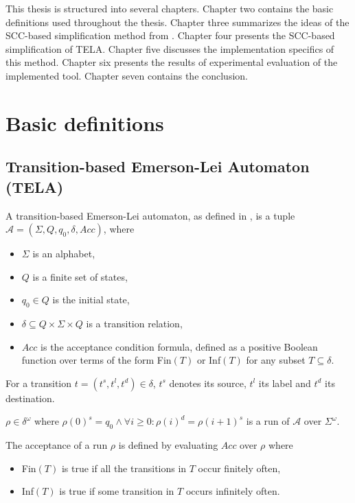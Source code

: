 \documentclass[
  digital, %
  twoside, %
  table,   %
  lof,     %
  lot,     %
]{fithesis3}
\begin{document}
This thesis is structured into several chapters. Chapter two contains the basic definitions used throughout the thesis. Chapter three summarizes the ideas of the SCC-based simplification method from \cite{spin2013}.  Chapter four presents the SCC-based simplification of TELA. Chapter five discusses the implementation specifics of this method. Chapter six presents the results of experimental evaluation of the implemented tool. Chapter seven contains the conclusion.

\chapter{Basic definitions}

\section{Transition-based Emerson-Lei Automaton (TELA)} 
A transition-based Emerson-Lei automaton, as defined in \cite{bloemen2017}, is a tuple $\mathcal{A} = (\Sigma, Q, q_0, \delta, Acc)$, where
\begin{itemize}
  \item $\Sigma$ is an alphabet,
  \item $Q$ is a finite set of states,
  \item $q_0 \in Q$ is the initial state,
  \item $\delta \subseteq Q \times \Sigma \times Q$ is a transition relation,
  \item $Acc$ is the acceptance condition formula, defined as a positive Boolean function over terms of the form Fin$(T)$ or Inf$(T)$ for any subset $T \subseteq \delta$. %
\end{itemize}

For a transition $t = (t^s, t^l, t^d) \in \delta$, $t^s$ denotes its source, $t^l$ its label and $t^d$ its destination.

$\rho \in \delta^\omega$ where $\rho(0)^s = q_0 \wedge \forall i \geq 0 : \rho(i)^d = \rho(i + 1)^s$ is a run of $\mathcal{A}$ over $\Sigma^\omega$.

The acceptance of a run $\rho$ is defined by evaluating $Acc$ over $\rho$ where
\begin{itemize}
  \item Fin$(T)$ is true if all the transitions in $T$ occur finitely often, 
  \item Inf$(T)$ is true if some transition in $T$ occurs infinitely often.
\end{itemize}
\end{document}
